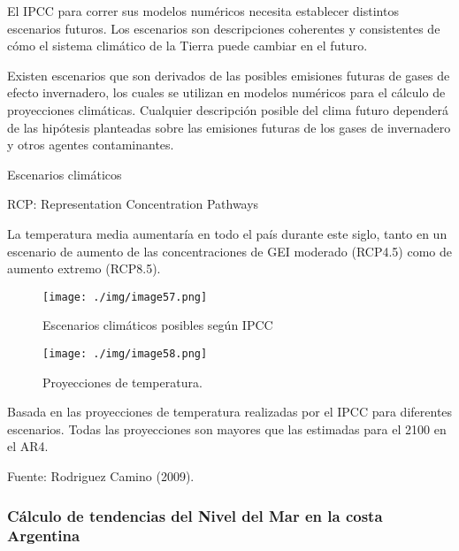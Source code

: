 \documentclass[
  a4paper,12pt]{extarticle}
\begin{document}
El IPCC para correr sus modelos numéricos necesita establecer distintos
escenarios futuros. Los escenarios son descripciones coherentes y
consistentes de cómo el sistema climático de la Tierra puede cambiar en
el futuro.

Existen escenarios que son derivados de las posibles emisiones futuras
de gases de efecto invernadero, los cuales se utilizan en modelos
numéricos para el cálculo de proyecciones climáticas. Cualquier
descripción posible del clima futuro dependerá de las hipótesis
planteadas sobre las emisiones futuras de los gases de invernadero y
otros agentes contaminantes.

Escenarios climáticos

RCP: Representation Concentration Pathways

La temperatura media aumentaría en todo el país durante este siglo,
tanto en un escenario de aumento de las concentraciones de GEI moderado
(RCP4.5) como de aumento extremo (RCP8.5).

\begin{figure}
\begin{center}
\begin{minipage}{0.6\textwidth}

\texttt{[image: ./img/image57.png]}

\caption{Escenarios climáticos posibles según IPCC}
\end{minipage}
\begin{minipage}{0.6\textwidth}

\texttt{[image: ./img/image58.png]}

\caption{ Proyecciones de temperatura.}
\end{minipage}
\end{center}
\end{figure}

Basada en las proyecciones de temperatura realizadas por el IPCC para
diferentes escenarios. Todas las proyecciones son mayores que las
estimadas para el 2100 en el AR4.

Fuente: Rodriguez Camino (2009).

\hypertarget{cuxe1lculo-de-tendencias-del-nivel-del-mar-en-la-costa-argentina}{%
\subsubsection{Cálculo de tendencias del Nivel del Mar en la costa
Argentina}\label{cuxe1lculo-de-tendencias-del-nivel-del-mar-en-la-costa-argentina}}
\end{document}
